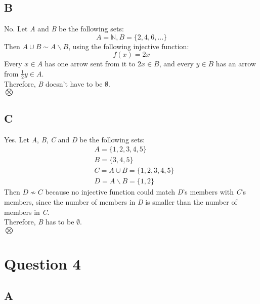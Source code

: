 \documentclass[12pt, oneside]{article}
\begin{document}
\subsection{B}
No. Let \emph{A} and \emph{B} be the following sets:
\begin{equation}
A = \mathbb{N}, B = \{2, 4, 6, \ldots\}
\end{equation}
Then $A \cup B \sim A \backslash B$, using the following injective function:
\begin{equation*}
f(x) = 2x
\end{equation*}
Every $x \in A$ has one arrow sent from it to $2x \in B$, and every $y \in B$ has an arrow from $\frac{1}{2}y \in A$.\\
Therefore, \emph{B} doesn't have to be $\emptyset$.\\
$\bigotimes$

\subsection{C}
Yes. Let \emph{A}, \emph{B}, \emph{C} and \emph{D} be the following sets:
\begin{equation*}
\begin{split}
& A = \{1, 2, 3, 4, 5\}\\
& B = \{3, 4, 5\}\\
& C = A \cup B = \{1, 2, 3, 4, 5\}\\
& D = A \backslash B = \{1, 2\}
\end{split}
\end{equation*}
Then $D \nsim C$ because no injective function could match \emph{D}'s members with \emph{C}'s members, since the number of members in \emph{D} is smaller than the number of members in \emph{C}.\\
Therefore, \emph{B} has to be $\emptyset$.\\
$\bigotimes$

\section{Question 4}
\subsection{A}
\end{document}
